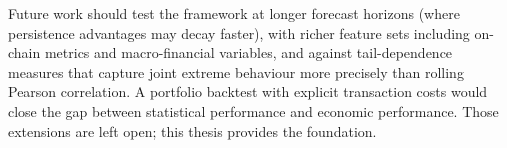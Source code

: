 Future work should test the framework at longer forecast horizons (where persistence advantages may decay faster), with richer feature sets including on-chain metrics and macro-financial variables, and against tail-dependence measures that capture joint extreme behaviour more precisely than rolling Pearson correlation. A portfolio backtest with explicit transaction costs would close the gap between statistical performance and economic performance. Those extensions are left open; this thesis provides the foundation.
